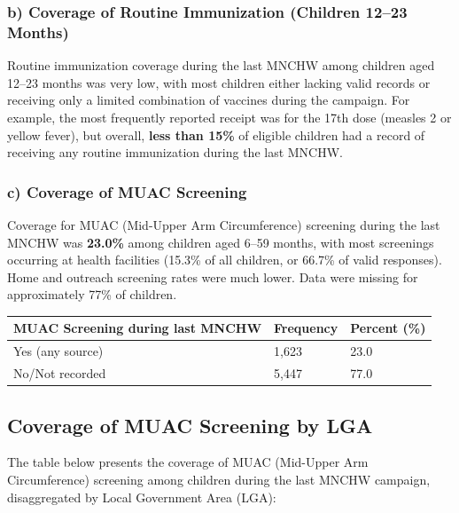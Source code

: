 \documentclass[
  11pt,
]{report}
\begin{document}
\subsubsection{b) Coverage of Routine Immunization (Children 12--23
Months)}\label{b-coverage-of-routine-immunization-children-1223-months}

Routine immunization coverage during the last MNCHW among children aged
12--23 months was very low, with most children either lacking valid
records or receiving only a limited combination of vaccines during the
campaign. For example, the most frequently reported receipt was for the
17th dose (measles 2 or yellow fever), but overall, \textbf{less than
15\%} of eligible children had a record of receiving any routine
immunization during the last MNCHW.

\subsubsection{c) Coverage of MUAC
Screening}\label{c-coverage-of-muac-screening}

Coverage for MUAC (Mid-Upper Arm Circumference) screening during the
last MNCHW was \textbf{23.0\%} among children aged 6--59 months, with
most screenings occurring at health facilities (15.3\% of all children,
or 66.7\% of valid responses). Home and outreach screening rates were
much lower. Data were missing for approximately 77\% of children.

\begin{longtable}[]{@{}lll@{}}
\toprule\noalign{}
MUAC Screening during last MNCHW & Frequency & Percent (\%) \\
\midrule\noalign{}
\endhead
\bottomrule\noalign{}
\endlastfoot
Yes (any source) & 1,623 & 23.0 \\
No/Not recorded & 5,447 & 77.0 \\
\end{longtable}

\subsection{Coverage of MUAC Screening by
LGA}\label{coverage-of-muac-screening-by-lga}

The table below presents the coverage of MUAC (Mid-Upper Arm
Circumference) screening among children during the last MNCHW campaign,
disaggregated by Local Government Area (LGA):
\end{document}
